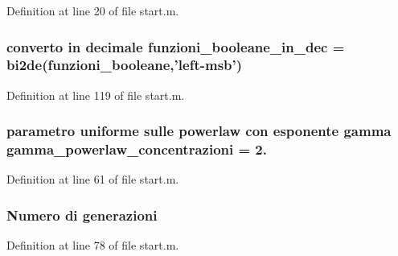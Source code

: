 Definition at line 20 of file start.\+m.

\hypertarget{a00113_af44cf9f59bd0c10b4d2aa541bd7c156b}{
\subsubsection[{funzioni\+\_\+booleane\+\_\+in\+\_\+dec}]{\setlength{\rightskip}{0pt plus 5cm}converto in decimale funzioni\+\_\+booleane\+\_\+in\+\_\+dec = bi2de(funzioni\+\_\+booleane,'left-\/msb')}}\label{a00113_af44cf9f59bd0c10b4d2aa541bd7c156b}


Definition at line 119 of file start.\+m.

\hypertarget{a00113_a7cd0915d7542523abc226a8eecf67ecf}{
\subsubsection[{gamma\+\_\+powerlaw\+\_\+concentrazioni}]{\setlength{\rightskip}{0pt plus 5cm}parametro uniforme sulle powerlaw con esponente gamma gamma\+\_\+powerlaw\+\_\+concentrazioni = 2.}}\label{a00113_a7cd0915d7542523abc226a8eecf67ecf}


Definition at line 61 of file start.\+m.

\hypertarget{a00113_a5951b3462407a0e7e2e60534f76f5fec}{
\subsubsection[{generazioni}]{\setlength{\rightskip}{0pt plus 5cm}Numero di generazioni}}\label{a00113_a5951b3462407a0e7e2e60534f76f5fec}


Definition at line 78 of file start.\+m.

